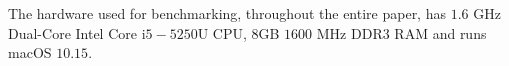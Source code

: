 The hardware used for benchmarking, throughout the entire paper, has $1.6$ GHz Dual-Core Intel Core i$5-5250$U CPU, $8$GB $1600$ MHz DDR3 RAM  and runs macOS $10.15$.  










